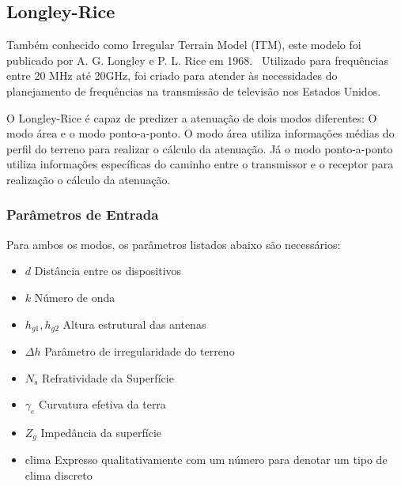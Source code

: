 \subsection{Longley-Rice}

Também conhecido como Irregular Terrain Model (ITM), este modelo foi publicado por A. G. Longley e P. L. Rice em 1968.~\cite{longleyrice} Utilizado para frequências entre 20 MHz até 20GHz, foi criado para atender às necessidades do planejamento de frequências na transmissão de televisão nos Estados Unidos.

O Longley-Rice é capaz de predizer a atenuação de dois modos diferentes: O modo área e o modo ponto-a-ponto. O modo área utiliza informações médias do perfil do terreno para realizar o cálculo da atenuação. Já o modo ponto-a-ponto utiliza informações específicas do caminho entre o transmissor e o receptor para realização o cálculo da atenuação.

\subsubsection{Parâmetros de Entrada}

Para ambos os modos, os parâmetros listados abaixo são necessários:

\begin{itemize}
\item \begin{math}d\end{math} Distância entre os dispositivos
\item \begin{math}k\end{math} Número de onda
\item \begin{math}h_{g1}, h_{g2}\end{math} Altura estrutural das antenas
\item \begin{math}\Delta h\end{math} Parâmetro de irregularidade do terreno
\item \begin{math}N_s\end{math} Refratividade da Superfície
\item \begin{math}\gamma _e\end{math} Curvatura efetiva da terra
\item \begin{math}Z_g\end{math} Impedância da superfície
\item clima Expresso qualitativamente com um número para denotar um tipo de clima discreto
\end{itemize}


